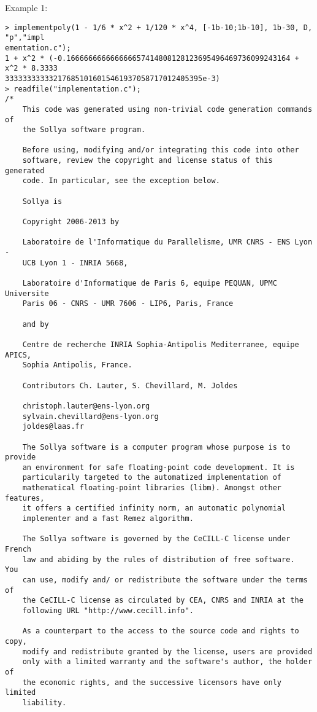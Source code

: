 \noindent Example 1: 
\begin{center}\begin{minipage}{15cm}\begin{Verbatim}[frame=single]
> implementpoly(1 - 1/6 * x^2 + 1/120 * x^4, [-1b-10;1b-10], 1b-30, D, "p","impl
ementation.c");
1 + x^2 * (-0.166666666666666657414808128123695496469736099243164 + x^2 * 8.3333
333333333332176851016015461937058717012405395e-3)
> readfile("implementation.c");
/*
    This code was generated using non-trivial code generation commands of
    the Sollya software program.
    
    Before using, modifying and/or integrating this code into other
    software, review the copyright and license status of this generated
    code. In particular, see the exception below.
    
    Sollya is
    
    Copyright 2006-2013 by
    
    Laboratoire de l'Informatique du Parallelisme, UMR CNRS - ENS Lyon -
    UCB Lyon 1 - INRIA 5668,
    
    Laboratoire d'Informatique de Paris 6, equipe PEQUAN, UPMC Universite
    Paris 06 - CNRS - UMR 7606 - LIP6, Paris, France
    
    and by
    
    Centre de recherche INRIA Sophia-Antipolis Mediterranee, equipe APICS,
    Sophia Antipolis, France.
    
    Contributors Ch. Lauter, S. Chevillard, M. Joldes
    
    christoph.lauter@ens-lyon.org
    sylvain.chevillard@ens-lyon.org
    joldes@laas.fr
    
    The Sollya software is a computer program whose purpose is to provide
    an environment for safe floating-point code development. It is
    particularily targeted to the automatized implementation of
    mathematical floating-point libraries (libm). Amongst other features,
    it offers a certified infinity norm, an automatic polynomial
    implementer and a fast Remez algorithm.
    
    The Sollya software is governed by the CeCILL-C license under French
    law and abiding by the rules of distribution of free software.  You
    can use, modify and/ or redistribute the software under the terms of
    the CeCILL-C license as circulated by CEA, CNRS and INRIA at the
    following URL "http://www.cecill.info".
    
    As a counterpart to the access to the source code and rights to copy,
    modify and redistribute granted by the license, users are provided
    only with a limited warranty and the software's author, the holder of
    the economic rights, and the successive licensors have only limited
    liability.
    

\end{Verbatim}
\end{minipage}
\end{center}
